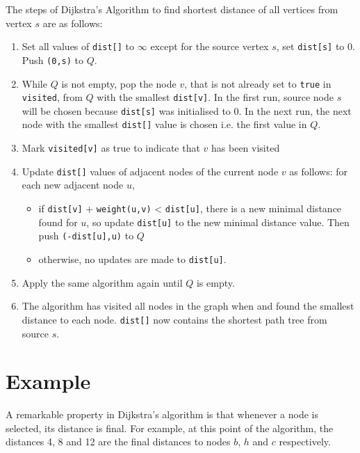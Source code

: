 \documentclass[twoside,12pt,a4paper,english]{book}
\theoremstyle{definition}
\theoremstyle{problemstyle}
\begin{document}
The steps of Dijkstra's Algorithm to find shortest distance of all vertices from vertex $s$ are as follows:
\begin{enumerate}

    \item Set all values of \texttt{dist[]} to $\infty$ except for the source vertex $s$, set \texttt{dist[s]} to $0$. Push \texttt{(0,s)} to $Q$.
    \item While $Q$ is not empty, pop the node $v$, that is not already set to \texttt{true} in \texttt{visited}, from $Q$ with the smallest \texttt{dist[v]}. In the first run, source node $s$ will be chosen because \texttt{dist[s]} was initialised to $0$. In the next run, the next node with the smallest \texttt{dist[]} value is chosen i.e. the first value in $Q$.
    \item Mark \texttt{visited[v]} as true to indicate that $v$ has been visited
    \item Update \texttt{dist[]} values of adjacent nodes of the current node $v$ as follows: for each new adjacent node $u$,
    \begin{itemize}
        \item if \texttt{dist[v]} $+$ \texttt{weight(u,v)} < \texttt{dist[u]}, there is a new minimal distance found for $u$, so update \texttt{dist[u]} to the new minimal distance value. Then push \texttt{(-dist[u],u)} to $Q$
        \item otherwise, no updates are made to \texttt{dist[u]}.
    \end{itemize}
    \item Apply the same algorithm again until $Q$ is empty.
    \item The algorithm has visited all nodes in the graph when  and found the smallest distance to each node. \texttt{dist[]} now contains the shortest path tree from source $s$.
\end{enumerate}

\section{Example}

\centerline{}

A remarkable property in Dijkstra’s algorithm is that whenever a node is
selected, its distance is final. For example, at this point of the algorithm, the
distances 4, 8 and 12 are the final distances to nodes $b$, $h$ and $c$ respectively.
\end{document}
